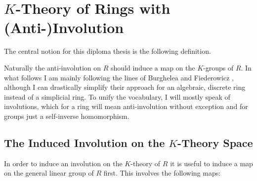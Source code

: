 \chapter{$K$-Theory of Rings with (Anti-)Involution}
The central notion for this diploma thesis is the following definition.


Naturally the anti-involution on $R$ should induce a map on the $K$-groups of $R$.
In what follows I am mainly following the lines of Burghelea and Fiederowicz \cite{BF},
although I can drastically simplify their approach for an algebraic, discrete ring
instead of a simplicial ring.
To unify the vocabulary, I will mostly speak of involutions, which for a ring will mean
anti-involution without exception and for groups just a self-inverse homomorphism.

\section{The Induced Involution on the $K$-Theory Space}

In order to induce an involution on the $K$-theory of $R$ it is useful to induce a map on the
general linear group of $R$ first. This involves the following maps:


